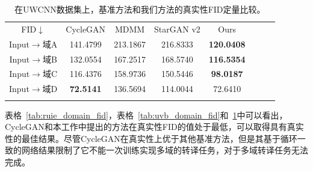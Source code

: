 \begin{table}[ht]
\centering
\caption{在UWCNN数据集上，基准方法和我们方法的真实性FID定量比较。}
  \begin{tabular}{c|ccccccc}
    \hline\noalign{\smallskip}
    FID$\downarrow$ & CycleGAN & MDMM & StarGAN v2 & Ours \\
    \noalign{\smallskip}\hline\noalign{\smallskip}
    Input$\rightarrow$域A & 141.4799 & 213.1867 & 216.8333 & \textbf{120.0408}  \\
    Input$\rightarrow$域B & 132.0554 & 167.2517 & 168.5740 & \textbf{116.5354}  \\
    Input$\rightarrow$域C & 116.4376 & 158.9736 & 150.5446 & \textbf{98.0187}  \\
    Input$\rightarrow$域D & \textbf{72.5141}  & 136.5694 & 114.0044 & 72.6410  \\
    \noalign{\smallskip}\hline
  \end{tabular}
  \label{tab:uwcnn_domain_fid}
\end{table}

表格~\ref{tab:ruie_domain_fid}，表格~\ref{tab:uvb_domain_fid}和~\ref{tab:uwcnn_domain_fid}中可以看出，CycleGAN和本工作中提出的方法在真实性FID的值处于最低，可以取得具有真实性的最佳结果。尽管CycleGAN在真实性上优于其他基准方法，但是其基于循环一致的网络结果限制了它不能一次训练实现多域的转译任务，对于多域转译任务无法完成。

